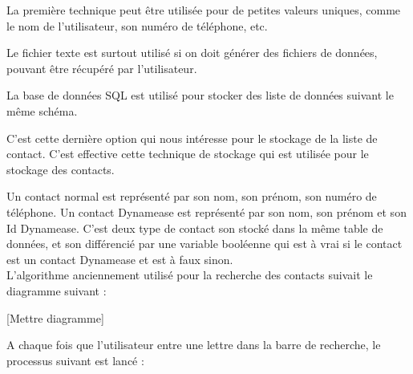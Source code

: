La première technique peut être utilisée pour de petites valeurs uniques, comme le nom de l'utilisateur, son numéro de téléphone, etc.

Le fichier texte est surtout utilisé si on doit générer des fichiers de données, pouvant être récupéré par l'utilisateur.

La base de données SQL est utilisé pour stocker des liste de données suivant le même schéma.

C'est cette dernière option qui nous intéresse pour le stockage de la liste de contact. C'est effective cette technique de stockage qui est utilisée pour le stockage des contacts.

Un contact normal est représenté par son nom, son prénom, son numéro de téléphone. Un contact Dynamease est représenté par son nom, son prénom et son Id Dynamease. C'est deux type de contact son stocké dans la même table de données, et son différencié par une variable booléenne qui est à vrai si le contact est un contact Dynamease et est à faux sinon.\\

L'algorithme anciennement utilisé pour la recherche des contacts suivait le diagramme suivant :

[Mettre diagramme]

A chaque fois que l'utilisateur entre une lettre dans la barre de recherche, le processus suivant est lancé :